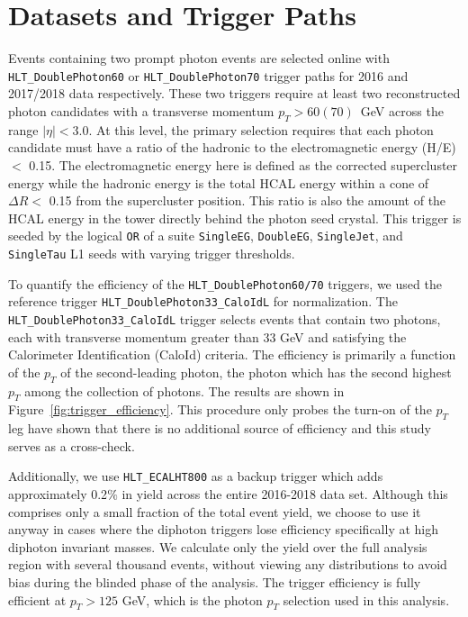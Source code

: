 \chapter{Datasets and Trigger Paths}\label{ch:appendix_datasets_triggerpaths}
\raggedright\parindent=25pt
Events containing two prompt photon events are selected online with \texttt{HLT\_DoublePhoton60} or \texttt{HLT\_DoublePhoton70} trigger paths for 2016 and 2017/2018 data respectively. These two triggers require at least two reconstructed photon candidates with a transverse momentum $p_{T} > 60 (70)$~GeV across the range $|\eta| < 3.0$. At this level, the primary selection requires that each photon candidate must have a ratio of the hadronic to the electromagnetic energy (H/E) $<$ 0.15. The electromagnetic energy here is defined as the corrected supercluster energy while the hadronic energy is the total HCAL energy within a cone of $\Delta R <$  0.15 from the supercluster position. This ratio is also the amount of the HCAL energy in the tower directly behind the photon seed crystal. This trigger is seeded by the logical \texttt{OR} of a suite \texttt{SingleEG}, \texttt{DoubleEG}, \texttt{SingleJet}, and \texttt{SingleTau} L1 seeds with varying trigger thresholds. 

To quantify the efficiency of the \texttt{HLT\_DoublePhoton60/70} triggers, we used the reference trigger \texttt{HLT\_DoublePhoton33\_CaloIdL} for normalization. The \texttt{HLT\_DoublePhoton33\_CaloIdL} trigger selects events that contain two photons, each with transverse momentum greater than 33 GeV and satisfying the Calorimeter Identification (CaloId) criteria. The efficiency is primarily a function of the $p_{T}$ of the second-leading photon, the photon which has the second highest $p_{T}$ among the collection of photons. The results are shown in Figure~\ref{fig:trigger_efficiency}. This procedure only probes the turn-on of the $p_{T}$ leg \cite{ref:AN2016_167} have shown that there is no additional source of efficiency and this study serves as a cross-check. 

Additionally, we use \texttt{HLT\_ECALHT800} as a backup trigger which adds approximately 0.2$\%$ in yield across the entire 2016-2018 data set. Although this comprises only a small fraction of the total event yield, we choose to use it anyway in cases where the diphoton triggers lose efficiency specifically at high diphoton invariant masses. We calculate only the yield over the full analysis region with several thousand events, without viewing any distributions to avoid bias during the blinded phase of the analysis. The trigger efficiency is fully efficient at $p_T > 125$ GeV, which is the photon $p_{T}$ selection used in this analysis. 

